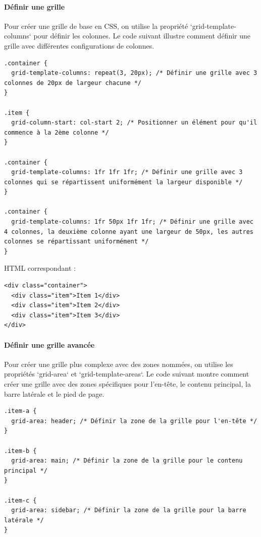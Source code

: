 \documentclass{report}
\begin{document}
\begin{multicols*}{2}
\paragraph{Définir une grille}
Pour créer une grille de base en CSS, on utilise la propriété `grid-template-columns` pour définir les colonnes. Le code suivant illustre comment définir une grille avec différentes configurations de colonnes.

\begin{lstlisting}[style=CSSDraculaLight]
.container {
  grid-template-columns: repeat(3, 20px); /* Définir une grille avec 3 colonnes de 20px de largeur chacune */
}

.item {
  grid-column-start: col-start 2; /* Positionner un élément pour qu'il commence à la 2ème colonne */
}

.container {
  grid-template-columns: 1fr 1fr 1fr; /* Définir une grille avec 3 colonnes qui se répartissent uniformément la largeur disponible */
}

.container {
  grid-template-columns: 1fr 50px 1fr 1fr; /* Définir une grille avec 4 colonnes, la deuxième colonne ayant une largeur de 50px, les autres colonnes se répartissant uniformément */
}
\end{lstlisting}

HTML correspondant :
\begin{lstlisting}[style=HTMLDraculaDark]
<div class="container">
  <div class="item">Item 1</div>
  <div class="item">Item 2</div>
  <div class="item">Item 3</div>
</div>
\end{lstlisting}

\paragraph{Définir une grille avancée}
Pour créer une grille plus complexe avec des zones nommées, on utilise les propriétés `grid-area` et `grid-template-areas`. Le code suivant montre comment créer une grille avec des zones spécifiques pour l'en-tête, le contenu principal, la barre latérale et le pied de page.

\begin{lstlisting}[style=CSSDraculaLight]
.item-a {
  grid-area: header; /* Définir la zone de la grille pour l'en-tête */
}

.item-b {
  grid-area: main; /* Définir la zone de la grille pour le contenu principal */
}

.item-c {
  grid-area: sidebar; /* Définir la zone de la grille pour la barre latérale */
}


\end{lstlisting}
\end{multicols*}
\end{document}
